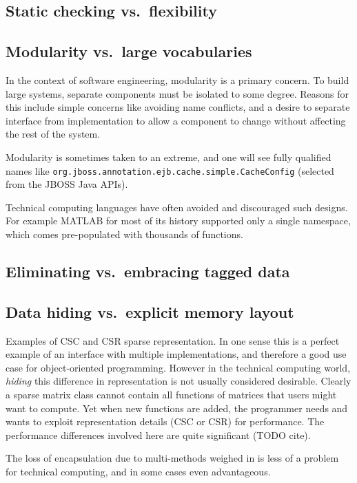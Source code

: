 \subsection{Static checking vs.\ flexibility}

\subsection{Modularity vs.\ large vocabularies}

In the context of software engineering, modularity is a primary concern.
To build large systems, separate components must be isolated to some
degree.
Reasons for this include simple concerns like avoiding name conflicts,
and a desire to separate interface from implementation to allow
a component to change without affecting the rest of the system.

Modularity is sometimes taken to an extreme, and one will see
fully qualified names like \texttt{org.jboss.annotation.ejb.cache.simple.CacheConfig}
(selected from the JBOSS Java APIs).

Technical computing languages have often avoided and discouraged such
designs. For example MATLAB for most of its history supported only a single
namespace, which comes pre-populated with thousands of functions.


\subsection{Eliminating vs.\ embracing tagged data}

\subsection{Data hiding vs.\ explicit memory layout}

Examples of CSC and CSR sparse representation.
In one sense this is a perfect example of an interface with multiple implementations,
and therefore a good use case for object-oriented programming.
However in the technical computing world, \emph{hiding} this difference in
representation is not usually considered desirable.
Clearly a sparse matrix class cannot contain all functions of matrices that users
might want to compute.
Yet when new functions are added, the programmer needs and wants to exploit
representation details (CSC or CSR) for performance.
The performance differences involved here are quite significant (TODO cite).

The loss of encapsulation due to multi-methods weighed in \cite{binarymethods}
is less of a problem for technical computing, and in some cases even
advantageous.


